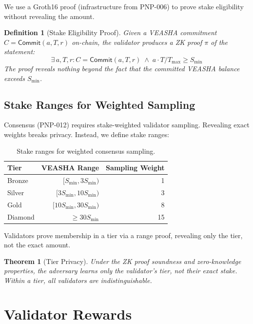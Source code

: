 \documentclass[11pt,a4paper]{article}
\newtheorem{definition}{Definition}[section]
\newtheorem{theorem}{Theorem}[section]
\begin{document}
We use a Groth16 proof (infrastructure from PNP-006) to prove stake
eligibility without revealing the amount.

\begin{definition}[Stake Eligibility Proof]
    Given a VEASHA commitment $C = \mathsf{Commit}(a, T, r)$ on-chain,
    the validator produces a ZK proof $\pi$ of the statement:
    \[
        \exists\, a, T, r : C = \mathsf{Commit}(a, T, r)
        \;\wedge\; a \cdot T / T_{\max} \geq S_{\min}
    \]
    The proof reveals nothing beyond the fact that the committed VEASHA
    balance exceeds $S_{\min}$.
\end{definition}

\subsection{Stake Ranges for Weighted Sampling}

Consensus (PNP-012) requires stake-weighted validator sampling.
Revealing exact weights breaks privacy.  Instead, we define stake
ranges:

\begin{table}[h]
\centering
\caption{Stake ranges for weighted consensus sampling.}
\label{tab:ranges}
\begin{tabular}{@{}lrr@{}}
\toprule
\textbf{Tier} & \textbf{VEASHA Range} & \textbf{Sampling Weight} \\
\midrule
Bronze  & $[S_{\min}, 3 S_{\min})$ & 1 \\
Silver  & $[3 S_{\min}, 10 S_{\min})$ & 3 \\
Gold    & $[10 S_{\min}, 30 S_{\min})$ & 8 \\
Diamond & $\geq 30 S_{\min}$ & 15 \\
\bottomrule
\end{tabular}
\end{table}

Validators prove membership in a tier via a range proof, revealing only
the tier, not the exact amount.

\begin{theorem}[Tier Privacy]
    Under the ZK proof soundness and zero-knowledge properties, the
    adversary learns only the validator's tier, not their exact stake.
    Within a tier, all validators are indistinguishable.
\end{theorem}

\section{Validator Rewards}
\label{sec:rewards}
\end{document}
